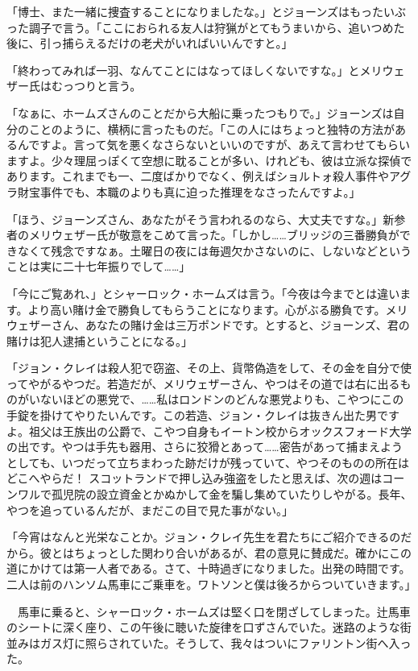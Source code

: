 \documentclass[tate,paper=b6j,jafontsize=9pt]{jlreq}
\begin{document}
「博士、また一緒に捜査することになりましたな。」とジョーンズはもったいぶった調子で言う。「ここにおられる友人は狩猟がとてもうまいから、追いつめた後に、引っ捕らえるだけの老犬がいればいいんですと。」

「終わってみれば一羽、なんてことにはなってほしくないですな。」とメリウェザー氏はむっつりと言う。

「なぁに、ホームズさんのことだから大船に乗ったつもりで。」ジョーンズは自分のことのように、横柄に言ったものだ。「この人にはちょっと独特の方法があるんですよ。言って気を悪くなさらないといいのですが、あえて言わせてもらいますよ。少々理屈っぽくて空想に耽ることが多い、けれども、彼は立派な探偵であります。これまでも一、二度ばかりでなく、例えばショルトォ殺人事件やアグラ財宝事件でも、本職のよりも真に迫った推理をなさったんですよ。」

「ほう、ジョーンズさん、あなたがそう言われるのなら、大丈夫ですな。」新参者のメリウェザー氏が敬意をこめて言った。「しかし……ブリッジの三番勝負ができなくて残念ですなぁ。土曜日の夜には毎週欠かさないのに、しないなどということは実に二十七年振りでして……」

「今にご覧あれ、」とシャーロック・ホームズは言う。「今夜は今までとは違います。より高い賭け金で勝負してもらうことになります。心がぶる勝負です。メリウェザーさん、あなたの賭け金は三万ポンドです。とすると、ジョーンズ、君の賭けは犯人逮捕ということになる。」

「ジョン・クレイは殺人犯で窃盗、その上、貨幣偽造をして、その金を自分で使ってやがるやつだ。若造だが、メリウェザーさん、やつはその道では右に出るものがいないほどの悪党で、……私はロンドンのどんな悪党よりも、こやつにこの手錠を掛けてやりたいんです。この若造、ジョン・クレイは抜きん出た男ですよ。祖父は王族出の公爵で、こやつ自身もイートン校からオックスフォード大学の出です。やつは手先も器用、さらに狡猾とあって……密告があって捕まえようとしても、いつだって立ちまわった跡だけが残っていて、やつそのものの所在はどこへやらだ！ スコットランドで押し込み強盗をしたと思えば、次の週はコーンワルで孤児院の設立資金とかぬかして金を騙し集めていたりしやがる。長年、やつを追っているんだが、まだこの目で見た事がない。」

「今宵はなんと光栄なことか。ジョン・クレイ先生を君たちにご紹介できるのだから。彼とはちょっとした関わり合いがあるが、君の意見に賛成だ。確かにこの道にかけては第一人者である。さて、十時過ぎになりました。出発の時間です。二人は前のハンソム馬車にご乗車を。ワトソンと僕は後ろからついていきます。」

　馬車に乗ると、シャーロック・ホームズは堅く口を閉ざしてしまった。辻馬車のシートに深く座り、この午後に聴いた旋律を口ずさんでいた。迷路のような街並みはガス灯に照らされていた。そうして、我々はついにファリントン街へ入った。
\end{document}
